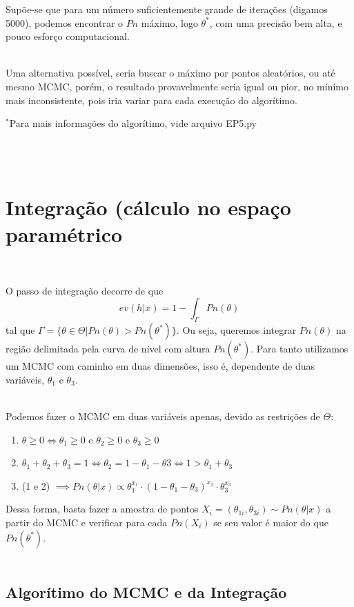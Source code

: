 \documentclass[pt12]{article}
\begin{document}
Supõe-se que para um número suficientemente grande de iterações (digamos 5000), podemos encontrar o $Pn$ máximo, logo $\theta^*$, com uma precisão bem alta, e pouco esforço computacional.\\
\ 

Uma alternativa possível, seria buscar o máximo por pontos aleatórios, ou até mesmo MCMC, porém, o resultado provavelmente seria igual ou pior, no mínimo mais inconsistente, pois iria variar para cada execução do algorítimo.\\

\begin{small}
$^*$Para mais informações do algorítimo, vide arquivo EP5.py
\end{small}\\
\ 

\section{Integração (cálculo no espaço paramétrico}
\ 

O passo de integração decorre de que
$$ev(h|x) = 1-\int_{\Gamma}Pn(\theta)$$
tal que $\displaystyle{\Gamma = \{ \theta \in \Theta|Pn(\theta) > Pn(\theta^*)\}}$. Ou seja, queremos integrar $Pn(\theta)$ na região delimitada pela curva de nível com altura $Pn(\theta^*)$. Para tanto utilizamos um MCMC com caminho em duas dimensões, isso é, dependente de duas variáveis, $\theta_1$ e $\theta_3$.\\
\ 

Podemos fazer o MCMC em duas variáveis apenas, devido as restrições de $\Theta$:

\begin{enumerate}
\item $\theta \geq 0 \iff \theta_1 \geq 0 \text{ e } \theta_2 \geq 0 \text{ e } \theta_3 \geq 0$
\item $\theta_1+\theta_2+\theta_3 = 1 \iff \theta_2 = 1 - \theta_1 - \theta3 \iff 1 > \theta_1 + \theta_3$
\item (1 e 2) $\implies \displaystyle{Pn(\theta|x) \propto \theta_1^{x_1}\cdot(1 - \theta_1 - \theta_3)^{x_2}\cdot\theta_3^{x_3}}$
\end{enumerate}

Dessa forma, basta fazer a amostra de pontos $X_i = (\theta_{1i},\theta_{3i})\sim Pn(\theta|x)$ a partir do MCMC e verificar para cada $Pn(X_i)$ se seu valor é maior do que $Pn(\theta^*)$.\\
\ 

\subsection{Algorítimo do MCMC e da Integração}
\ 
\end{document}
